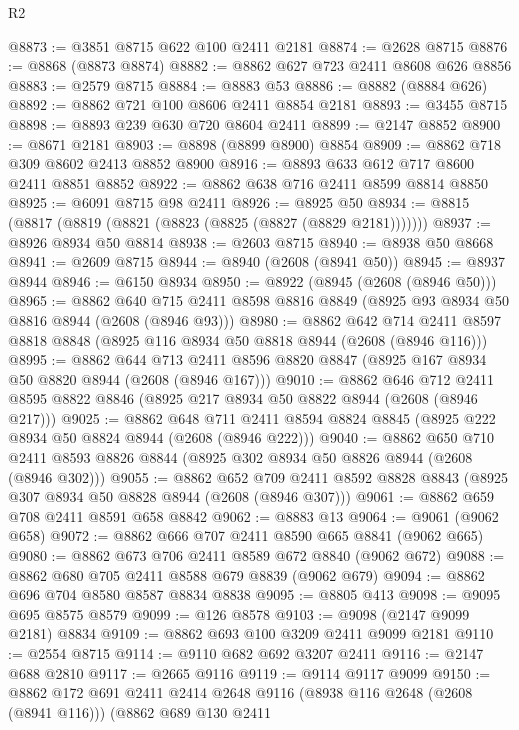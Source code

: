 \begin{lexlean}{R2}
\begin{coremodule}
@8873 := @3851 @8715 @622 @100 @2411 @2181
@8874 := @2628 @8715
@8876 := @8868 (@8873 @8874)
@8882 := @8862 @627 @723 @2411 @8608 @626 @8856
@8883 := @2579 @8715
@8884 := @8883 @53
@8886 := @8882 (@8884 @626)
@8892 := @8862 @721 @100 @8606 @2411 @8854 @2181
@8893 := @3455 @8715
@8898 := @8893 @239 @630 @720 @8604 @2411
@8899 := @2147 @8852
@8900 := @8671 @2181
@8903 := @8898 (@8899 @8900) @8854
@8909 := @8862 @718 @309 @8602 @2413 @8852 @8900
@8916 := @8893 @633 @612 @717 @8600 @2411 @8851 @8852
@8922 := @8862 @638 @716 @2411 @8599 @8814 @8850
@8925 := @6091 @8715 @98 @2411
@8926 := @8925 @50
@8934 := @8815 (@8817 (@8819 (@8821 (@8823 (@8825 (@8827 (@8829 @2181)))))))
@8937 := @8926 @8934 @50 @8814
@8938 := @2603 @8715
@8940 := @8938 @50 @8668
@8941 := @2609 @8715
@8944 := @8940 (@2608 (@8941 @50))
@8945 := @8937 @8944
@8946 := @6150 @8934
@8950 := @8922 (@8945 (@2608 (@8946 @50)))
@8965 := @8862
    @640
    @715
    @2411
    @8598
    @8816
    @8849
    (@8925 @93 @8934 @50 @8816 @8944 (@2608 (@8946 @93)))
@8980 := @8862
    @642
    @714
    @2411
    @8597
    @8818
    @8848
    (@8925 @116 @8934 @50 @8818 @8944 (@2608 (@8946 @116)))
@8995 := @8862
    @644
    @713
    @2411
    @8596
    @8820
    @8847
    (@8925 @167 @8934 @50 @8820 @8944 (@2608 (@8946 @167)))
@9010 := @8862
    @646
    @712
    @2411
    @8595
    @8822
    @8846
    (@8925 @217 @8934 @50 @8822 @8944 (@2608 (@8946 @217)))
@9025 := @8862
    @648
    @711
    @2411
    @8594
    @8824
    @8845
    (@8925 @222 @8934 @50 @8824 @8944 (@2608 (@8946 @222)))
@9040 := @8862
    @650
    @710
    @2411
    @8593
    @8826
    @8844
    (@8925 @302 @8934 @50 @8826 @8944 (@2608 (@8946 @302)))
@9055 := @8862
    @652
    @709
    @2411
    @8592
    @8828
    @8843
    (@8925 @307 @8934 @50 @8828 @8944 (@2608 (@8946 @307)))
@9061 := @8862 @659 @708 @2411 @8591 @658 @8842
@9062 := @8883 @13
@9064 := @9061 (@9062 @658)
@9072 := @8862 @666 @707 @2411 @8590 @665 @8841 (@9062 @665)
@9080 := @8862 @673 @706 @2411 @8589 @672 @8840 (@9062 @672)
@9088 := @8862 @680 @705 @2411 @8588 @679 @8839 (@9062 @679)
@9094 := @8862 @696 @704 @8580 @8587 @8834 @8838
@9095 := @8805 @413
@9098 := @9095 @695 @8575 @8579
@9099 := @126 @8578
@9103 := @9098 (@2147 @9099 @2181) @8834
@9109 := @8862 @693 @100 @3209 @2411 @9099 @2181
@9110 := @2554 @8715
@9114 := @9110 @682 @692 @3207 @2411
@9116 := @2147 @688 @2810
@9117 := @2665 @9116
@9119 := @9114 @9117 @9099
@9150 := @8862
    @172
    @691
    @2411
    @2414
    @2648
    @9116
    (@8938 @116 @2648 (@2608 (@8941 @116)))
    (@8862
      @689
      @130
      @2411

\end{coremodule}
\end{lexlean}
